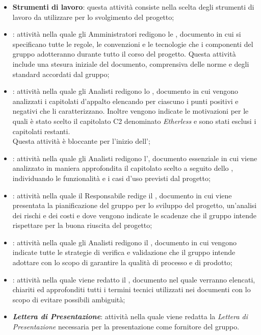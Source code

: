 \begin{itemize}
	\item \textbf{Strumenti di lavoro}: questa attività consiste nella scelta degli strumenti di lavoro da utilizzare per lo svolgimento del progetto;
	\item \textbf{\textit{\NdP{}}}: attività nella quale gli Amministratori redigono le \textit{\NdP{}}, documento in cui si specificano tutte le regole, le convenzioni e le tecnologie che i componenti del gruppo adotteranno durante tutto il corso del progetto. Questa attività include una stesura iniziale del documento, comprensiva delle norme e degli standard accordati dal gruppo;
	\item \textbf{\textit{\SdF{}}}: attività nella quale gli Analisti redigono lo \textit{\SdF}, documento in cui vengono analizzati i capitolati d'appalto elencando per ciascuno i punti positivi e negativi che li caratterizzano. Inoltre vengono indicate le motivazioni per le quali è stato scelto il capitolato C2 denominato \textit{Etherless} e sono stati esclusi i capitolati restanti. \\
	Questa attività è bloccante per l'inizio dell'\textit{\AdR{}};
	\item \textbf{\textit{\AdR{}}}: attività nella quale gli Analisti redigono l'\textit{\AdR{}}, documento essenziale in cui viene analizzato in maniera approfondita il capitolato scelto a seguito dello \textit{\SdF}, individuando le funzionalità e i casi d'uso previsti dal progetto;
	\item \textbf{\textit{\PdP{}}}: attività nella quale il Responsabile redige il \textit{\PdP}, documento in cui viene presentata la pianificazione del gruppo per lo sviluppo del progetto, un'analisi dei rischi e dei costi e dove vengono indicate le scadenze che il gruppo intende rispettare per la buona riuscita del progetto;
	\item \textbf{\textit{\PdQ{}}}: attività nella quale gli Analisti redigono il \textit{\PdQ}, documento in cui vengono indicate tutte le strategie di verifica e validazione che il gruppo intende adottare con lo scopo di garantire la qualità di processo e di prodotto;
	\item \textbf{\textit{\Glossario{}}}: attività nella quale viene redatto il \textit{\Glossario}, documento nel quale verranno elencati, chiariti ed approfonditi tutti i termini tecnici utilizzati nei documenti con lo scopo di evitare possibili ambiguità;
	\item \textbf{\textit{Lettera di Presentazione}}: attività nella quale viene redatta la \textit{Lettera di Presentazione} necessaria per la presentazione come fornitore del gruppo.
\end{itemize}

